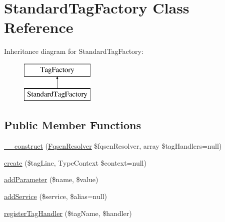 \hypertarget{classphp_documentor_1_1_reflection_1_1_doc_block_1_1_standard_tag_factory}{}\section{Standard\+Tag\+Factory Class Reference}
\label{classphp_documentor_1_1_reflection_1_1_doc_block_1_1_standard_tag_factory}
Inheritance diagram for Standard\+Tag\+Factory\+:\begin{figure}[H]
\begin{center}
\leavevmode
\includegraphics[height=2.000000cm]{classphp_documentor_1_1_reflection_1_1_doc_block_1_1_standard_tag_factory}
\end{center}
\end{figure}
\subsection*{Public Member Functions}
\begin{DoxyCompactItemize}
\item 
\mbox{\hyperlink{classphp_documentor_1_1_reflection_1_1_doc_block_1_1_standard_tag_factory_aac5d2219cdfa4c09e8f6ce6e874471b9}{\+\_\+\+\_\+construct}} (\mbox{\hyperlink{classphp_documentor_1_1_reflection_1_1_fqsen_resolver}{Fqsen\+Resolver}} \$fqsen\+Resolver, array \$tag\+Handlers=null)
\item 
\mbox{\hyperlink{classphp_documentor_1_1_reflection_1_1_doc_block_1_1_standard_tag_factory_a0daeb138405d397a02abe57bc3e6a274}{create}} (\$tag\+Line, Type\+Context \$context=null)
\item 
\mbox{\hyperlink{classphp_documentor_1_1_reflection_1_1_doc_block_1_1_standard_tag_factory_a866abdd2dc807cd23873af01cb41f4c6}{add\+Parameter}} (\$name, \$value)
\item 
\mbox{\hyperlink{classphp_documentor_1_1_reflection_1_1_doc_block_1_1_standard_tag_factory_aab37dfb4762502cde73504df7b36f3aa}{add\+Service}} (\$service, \$alias=null)
\item 
\mbox{\hyperlink{classphp_documentor_1_1_reflection_1_1_doc_block_1_1_standard_tag_factory_ab57c71828fcf271fc43f9422ca1163d2}{register\+Tag\+Handler}} (\$tag\+Name, \$handler)
\end{DoxyCompactItemize}
